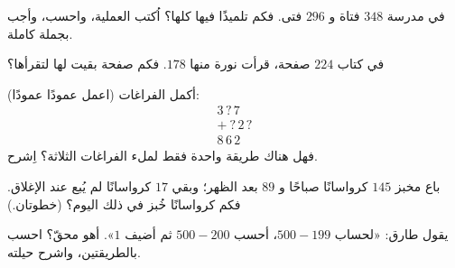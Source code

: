\begin{exercise}[$\star$]\label{exo:g3:addsub:7}
في مدرسة $348$ فتاة و $296$ فتى. فكم تلميذًا فيها كلها؟
اُكتب العملية، واحسب، وأجب بجملة كاملة.
\end{exercise}

\begin{exercise}[$\star$]\label{exo:g3:addsub:8}
في كتاب $224$ صفحة، قرأت نورة منها $178$. فكم صفحة بقيت لها
لتقرأها؟
\end{exercise}

\begin{exercise}[$\star$]\label{exo:g3:addsub:9}
أكمل الفراغات (اعمل عمودًا عمودًا):
\[
\begin{array}{r}
3\,?\,7 \\
+\ ?\,2\,? \\
\hline
8\,6\,2
\end{array}
\]
فهل هناك طريقة واحدة فقط لملء الفراغات الثلاثة؟ اِشرح.
\end{exercise}

\begin{exercise}[$\star\star$]\label{exo:g3:addsub:10}
باع مخبز $145$ كرواسانًا صباحًا و $89$ بعد الظهر؛ وبقي $17$
كرواسانًا لم يُبع عند الإغلاق. فكم كرواسانًا خُبز في ذلك اليوم؟
(خطوتان.)
\end{exercise}

\begin{exercise}[$\star\star$]\label{exo:g3:addsub:11}
يقول طارق: «لحساب $500 - 199$، أحسب $500 - 200$ ثم
أضيف $1$». أهو محقّ؟ احسب بالطريقتين، واشرح حيلته.
\end{exercise}
